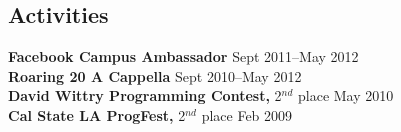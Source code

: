 \documentclass[margin]{res}
\begin{document}
\begin{resume}
\section{Activities}
 {\bf Facebook Campus Ambassador} \hfill Sept 2011--May 2012 \\
 {\bf Roaring 20 A Cappella} \hfill Sept 2010--May 2012 \\
 {\bf David Wittry Programming Contest,} 2$^{nd}$ place \hfill May 2010 \\
 {\bf Cal State LA ProgFest,} 2$^{nd}$ place \hfill Feb 2009

\end{resume}
\end{document}

